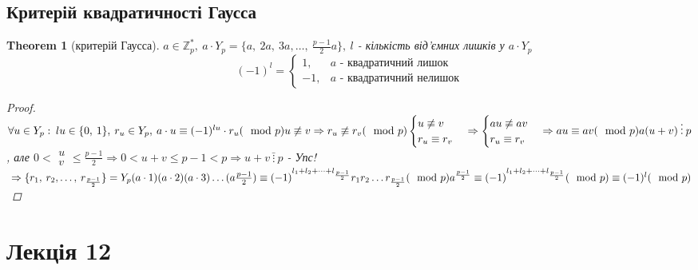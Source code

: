 \documentclass[a4paper,12pt]{bookest}
\newtheorem{theorem}{Theorem}[section]
\begin{document}
\section{Критерій квадратичності Гаусса}
\begin{theorem}[критерій Гаусса]
	$a\in\mathbb{Z}_p^*,\>a\cdot Y_p=\{a,\>2a,\>3a,\dots,\>\frac {p-1}{2}a\},\>l$ - кількість від'ємних лишків у $a\cdot Y_p$
	$$(-1)^l=\left\{\begin{array}{ll}
		1, & a\textrm{ - квадратичний лишок}\\
		-1, & a\textrm{ - квадратичний нелишок}	 
	\end{array}\right.$$
	\begin{proof}
		$\\\forall u\in Y_p:\>lu\in\{0,\>1\},\>r_u\in Y_p,\>a\cdot u\equiv(-1)^{lu}\cdot r_u(\mod p)\\u\not\equiv v\Rightarrow r_u\not\equiv r_v(\mod p)\\\begin{cases}
			u\not\equiv v\\r_u\equiv r_v
		\end{cases}\Rightarrow\begin{cases}
			au\not\equiv av\\r_u\equiv r_v
		\end{cases}\Rightarrow au\equiv av(\mod p)\\a(u+v)\>\vdots\>p$, але $0<\begin{array}{c}
			u\\v 
		\end{array}\leq \frac {p-1}{2}\Rightarrow0<u+v\leq p-1<p\Rightarrow u+v\>\bar{\vdots}\>p$ - Упс!
		$\\\Rightarrow\{r_1,\>r_2,\dots,\>r_{\frac {p-1}{2}}\}=Y_p\\(a\cdot1)(a\cdot2)(a\cdot3)\dots(a\frac {p-1}{2})\equiv(-1)^{l_1+l_2+\dots+l_{\frac {p-1}{2}}}r_1r_2\dots r_{\frac {p-1}{2}}(\mod p)\\a^{\frac {p-1}{2}}\equiv(-1)^{l_1+l_2+\dots+l_{\frac {p-1}{2}}}(\mod p)\equiv(-1)^l(\mod p)$
	\end{proof}
\end{theorem}
\chapter{Лекція 12                                                                                                                                                                   }
\end{document}
